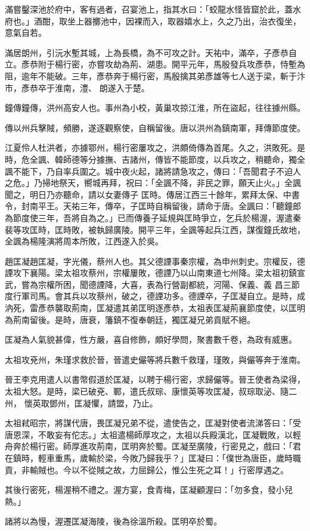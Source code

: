 \begin{pinyinscope}
 滿嘗鑿深池於府中，客有過者，召宴池上，指其水曰：「蛟龍水怪皆窟於此，蓋水府也。」酒酣，取坐上器擲池中，因裸而入，取器嬉水上，久之乃出，治衣復坐，意氣自若。



 滿居朗州，引沅水塹其城，上為長橋，為不可攻之計。天祐中，滿卒，子彥恭自立。彥恭附于楊行密，亦嘗攻劫為荊、湖患。開平元年，馬殷發兵攻彥恭，恃塹為阻，逾年不能破。三年，彥恭奔于楊行密，馬殷擒其弟彥雄等七人送于梁，斬于汴市，彥恭卒于淮南，澧、
 朗遂入于楚。



 鐘傳鐘傳，洪州高安人也。事州為小校，黃巢攻掠江淮，所在盜起，往往據州縣。



 傳以州兵擊賊，頻勝，遂逐觀察使，自稱留後。唐以洪州為鎮南軍，拜傳節度使。



 江夏伶人杜洪者，亦據鄂州，楊行密屢攻之，洪頗倚傳為首尾。久之，洪敗死。是時，危全諷、韓師德等分據撫、吉諸州，傳皆不能節度，以兵攻之，稍聽命，獨全諷不能下，乃自率兵圍之。城中夜火起，諸將請急攻之，傳曰：「吾聞君子不迫人之危。」乃掃地祭天，嚮城再拜，祝曰：「全諷不降，非民之罪，願天止火。」全諷聞之，明日乃亦聽命，請以女妻傳子
 匡時。傳居江西三十餘年，累拜太保、中書令，封南平王。天祐三年，傳卒，子匡時自稱留後，請命于唐。全諷曰：「聽鐘郎為節度使三年，吾將自為之。」已而傳養子延規與匡時爭立，乞兵於楊渥，渥遣秦裴等攻匡時，匡時敗，被執歸廣陵。開平三年，全諷等起兵江西，謀復鐘氏故地，全諷為楊隆演將周本所敗，江西遂入於吳。



 趙匡凝趙匡凝，字光儀，蔡州人也。其父德諲事秦宗權，為申州刺史。宗權反，德諲攻下襄陽。梁太祖攻蔡州，宗權屢敗，德諲乃以山南東道七州降。梁太祖初鎮宣武，嘗為宗權所困，聞德諲降，大喜，表為行營副都統，河陽、保義、義
 昌三節度行軍司馬。會其兵以攻蔡州，破之，德諲功多。德諲卒，子匡凝自立。是時，成汭死，雷彥恭襲取荊南，匡凝遣其弟匡明逐彥恭，太祖表匡凝荊襄節度使，以匡明為荊南留後。是時，唐衰，籓鎮不復奉朝廷，獨匡凝兄弟貢賦不絕。



 匡凝為人氣貌甚偉，性方嚴，喜自修飾，頗好學問，聚書數千卷，為政有威惠。



 太祖攻兗州，朱瑾求救於晉，晉遣史儼等將兵數千救瑾，瑾敗，與儼等奔于淮南。



 晉王李克用遣人以書幣假道於匡凝，以聘于楊行密，求歸儼等。晉王使者為梁得，太祖大怒。是時，梁已破兗、鄆，遣氏叔琮、康懷英等攻匡凝，叔琮取泌、隨二州，
 懷英取鄧州，匡凝懼，請盟，乃止。



 太祖弒昭宗，將謀代唐，畏匡凝兄弟不從，遣使告之，匡凝對使者流涕答曰：「受唐恩深，不敢妄有佗志。」太祖遣楊師厚攻之，太祖以兵殿漢北，匡凝戰敗，以輕舟奔於楊行密。師厚進攻荊南，匡明奔於蜀。匡凝至廣陵，行密見之，戲曰：「君在鎮時，輕車重馬，歲輸於梁，今敗乃歸我乎？」匡凝曰：「僕世為唐臣，歲時職貢，非輸賊也。今以不從賊之故，力屈歸公，惟公生死之耳！」行密厚遇之。



 其後行密死，楊渥稍不禮之。渥方宴，食青梅，匡凝顧渥曰：「勿多食，發小兒熱。」



 諸將以為慢，渥遷匡凝海陵，後為徐溫所殺。匡明卒於蜀。



\end{pinyinscope}